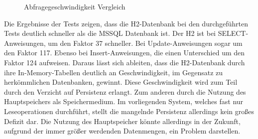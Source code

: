 \begin{figure}[htbp]
\centering
{}\hfill
{}\hfill
{}
\caption{Abfragegeschwindigkeit Vergleich}
\label{ergebniss_vergleich}
\end{figure}

Die Ergebnisse der Tests zeigen, dass die H2-Datenbank bei den durchgeführten Tests deutlich schneller als die MSSQL Datenbank ist. Der H2 ist bei SELECT-Anweisungen, um den Faktor 37 schneller. Bei Update-Anweisungen sogar um den Faktor 117. Ebenso bei Insert-Anweisungen, die einen Unterschied um den Faktor 124 aufweisen. Daraus lässt sich ableiten, dass die H2-Datenbank durch ihre In-Memory-Tabellen deutlich an Geschwindigkeit, im Gegensatz zu herkömmlichen Datenbanken, gewinnt. Diese Geschwindigkeit wird zum Teil durch den Verzicht auf Persistenz erlangt. Zum anderen durch die Nutzung des Hauptspeichers als Speichermedium. Im vorliegenden System, welches fast nur Leseoperationen durchführt, stellt die mangelnde Persistenz allerdings kein großes Defizit dar. Die Nutzung des Hauptspeicher könnte allerdings in der Zukunft, aufgrund der immer größer werdenden Datenmengen, ein Problem darstellen.  

